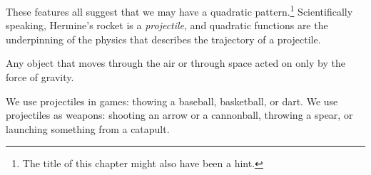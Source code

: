 These features all suggest that we may have a quadratic pattern.\footnote{The title of this chapter might also have been a hint.} Scientifically speaking, Hermine's rocket is a \textit{projectile}, and quadratic functions are the underpinning of the physics that describes the trajectory of a projectile.

%
%
%
%

\begin{boxeddef}[Projectile]
Any object that moves through the air or through space acted on only by the force of gravity.
\end{boxeddef}

We use projectiles in games: thowing a baseball, basketball, or dart. We use projectiles as weapons: shooting an arrow or a cannonball, throwing a spear, or launching something from a catapult.

